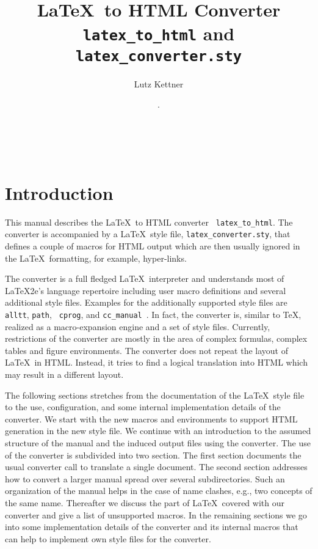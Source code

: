 \documentclass[12pt]{article}
\title{\LaTeX\ to HTML Converter\\
       {\tt latex\_to\_html} and {\tt latex\_converter.sty}}
\author{Lutz Kettner}
\date{\lcRevision. \lcDate}
\begin{document}
\maketitle

\tableofcontents
\thispagestyle{empty}
\clearpage
\thispagestyle{empty}
~\vfill



\cleardoublepage\setcounter{page}{1}

\section{Introduction}

This manual describes the \LaTeX\ to HTML converter {\tt
  latex\_to\_html}. The converter is accompanied by a \LaTeX\ style
file, {\tt latex\_converter.sty}, that defines a couple of macros for
HTML output which are then usually ignored in the \LaTeX\ formatting,
for example, hyper-links.

The converter is a full fledged \LaTeX\ interpreter and understands
most of \LaTeX2e's language repertoire including user macro
definitions and several additional style files.  Examples for the
additionally supported style files are {\tt alltt}, {\tt path}, {\tt
  cprog}, and {\tt cc\_manual}~\cite{k-clswr-99}. In fact, the
converter is, similar to \TeX, realized as a macro-expansion engine
and a set of style files.  Currently, restrictions of the converter
are mostly in the area of complex formulas, complex tables and figure
environments. The converter does not repeat the layout of \LaTeX\ in
HTML. Instead, it tries to find a logical translation into HTML which
may result in a different layout.

The following sections stretches from the documentation of the \LaTeX\ 
style file to the use, configuration, and some internal implementation
details of the converter. We start with the new macros and
environments to support HTML generation in the new style file. We
continue with an introduction to the assumed structure of the manual
and the induced output files using the converter. The use of the
converter is subdivided into two section. The first section documents
the usual converter call to translate a single document. The second
section addresses how to convert a larger manual spread over several
subdirectories. Such an organization of the manual helps in the case
of name clashes, e.g., two concepts of the same name.  Thereafter we
discuss the part of \LaTeX\ covered with our converter and give a list
of unsupported macros. In the remaining sections we go into some
implementation details of the converter and its internal macros that
can help to implement own style files for the converter.
\end{document}
